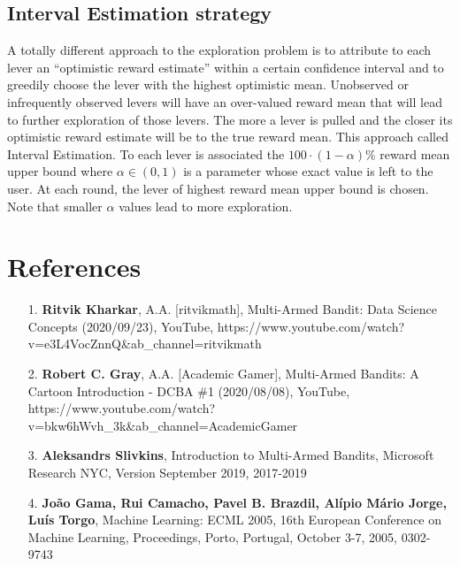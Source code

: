 \documentclass[11pt,american,czech]{article}
\begin{document}
	\subsection*{Interval Estimation strategy}
	A totally different approach to the exploration problem is to attribute to each lever an “optimistic reward estimate” within a certain confidence interval and to greedily choose the lever with the highest optimistic mean. Unobserved or infrequently observed levers will have an over-valued reward mean that will lead to further exploration of those levers. The more a lever is pulled and the closer its optimistic reward estimate will be to the true reward mean. This approach called Interval Estimation. To each lever is associated the $100\cdot(1-\alpha)$\% reward mean upper bound where $\alpha\in(0,1)$ is a parameter whose exact value is left to the user. At each round, the lever of highest reward mean upper bound is chosen. Note that smaller $\alpha$ values lead to more exploration.
	
	
	\clearpage
	\section*{References}
	\begin{enumerate}
		\item[1.] \textbf{Ritvik Kharkar}, A.A. [ritvikmath], Multi-Armed Bandit: Data Science Concepts (2020/09/23), YouTube, https://www.youtube.com/watch?v=e3L4VocZnnQ\&ab\_channel=ritvikmath
		\item[2.] \textbf{Robert C. Gray}, A.A. [Academic Gamer], Multi-Armed Bandits: A Cartoon Introduction - DCBA \#1 (2020/08/08), YouTube, \\https://www.youtube.com/watch?v=bkw6hWvh\_3k\&ab\_channel=AcademicGamer
		\item[3.] \textbf{Aleksandrs Slivkins}, Introduction to Multi-Armed Bandits, Microsoft Research NYC, Version September 2019, 2017-2019
		\item[4.] \textbf{João Gama, Rui Camacho, Pavel B. Brazdil, Alípio Mário Jorge, Luís Torgo}, Machine Learning: ECML 2005, 16th European Conference on Machine Learning, Proceedings, Porto, Portugal, October 3-7, 2005, 0302-9743
	\end{enumerate}
	
\end{document}
